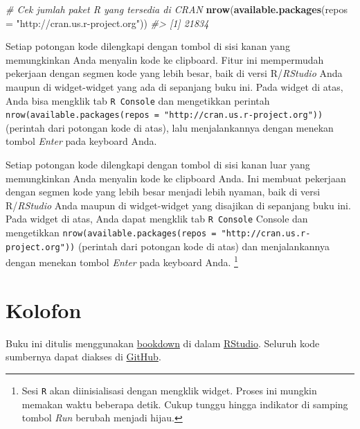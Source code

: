 \documentclass[
  oneside]{book}
\newenvironment{Shaded}{\begin{snugshade}}{\end{snugshade}}
\newcommand{\AttributeTok}[1]{\textcolor[rgb]{0.13,0.29,0.53}{#1}}
\newcommand{\CommentTok}[1]{\textcolor[rgb]{0.56,0.35,0.01}{\textit{#1}}}
\newcommand{\FunctionTok}[1]{\textcolor[rgb]{0.13,0.29,0.53}{\textbf{#1}}}
\newcommand{\NormalTok}[1]{#1}
\newcommand{\StringTok}[1]{\textcolor[rgb]{0.31,0.60,0.02}{#1}}
\begin{document}
\begin{Shaded}
\begin{Highlighting}[]
\CommentTok{\# Cek jumlah paket R yang tersedia di CRAN}
\FunctionTok{nrow}\NormalTok{(}\FunctionTok{available.packages}\NormalTok{(}\AttributeTok{repos =} \StringTok{"http://cran.us.r{-}project.org"}\NormalTok{))}
\CommentTok{\#\textgreater{} [1] 21834}
\end{Highlighting}
\end{Shaded}

Setiap potongan kode dilengkapi dengan tombol di sisi kanan yang
memungkinkan Anda menyalin kode ke clipboard. Fitur ini mempermudah
pekerjaan dengan segmen kode yang lebih besar, baik di versi
R/\emph{RStudio} Anda maupun di widget-widget yang ada di sepanjang
buku ini. Pada widget di atas, Anda bisa mengklik tab
\texttt{R Console} dan mengetikkan perintah
\texttt{nrow(available.packages(repos\ =\ "http://cran.us.r-project.org"))}
(perintah dari potongan kode di atas), lalu menjalankannya dengan
menekan tombol \emph{Enter} pada keyboard Anda.

Setiap potongan kode dilengkapi dengan tombol di sisi kanan luar yang
memungkinkan Anda menyalin kode ke clipboard Anda. Ini membuat pekerjaan
dengan segmen kode yang lebih besar menjadi lebih nyaman, baik di versi
R/\emph{RStudio} Anda maupun di widget-widget yang disajikan di
sepanjang buku ini. Pada widget di atas, Anda dapat mengklik tab
\texttt{R Console} Console dan mengetikkan
\texttt{nrow(available.packages(repos\ =\ "http://cran.us.r-project.org"))}
(perintah dari potongan kode di atas) dan menjalankannya dengan menekan
tombol \emph{Enter} pada keyboard Anda. \footnote{Sesi \texttt{R} akan diinisialisasi dengan mengklik
  widget. Proses ini mungkin memakan waktu beberapa detik. Cukup
  tunggu hingga indikator di samping tombol \emph{Run} berubah menjadi
  hijau.}

\section{Kolofon}\label{kolofon}

Buku ini ditulis menggunakan \href{http://bookdown.org/}{bookdown} di dalam
\href{http://www.rstudio.com/ide/}{RStudio}. Seluruh kode sumbernya dapat
diakses di \href{https://github.com/dedenistiawan/ClustR}{GitHub}.
\end{document}
